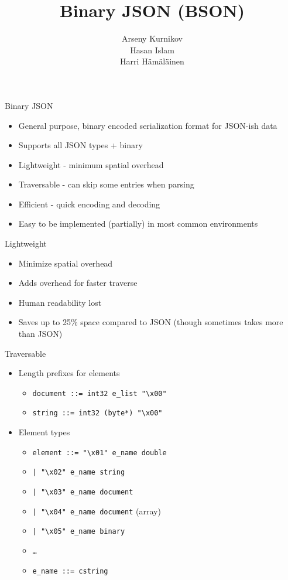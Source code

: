 \documentclass{beamer}
\title{Binary JSON (BSON)}
\author{Arseny Kurnikov\\
Hasan Islam\\
Harri Hämäläinen}
\begin{document}
\begin{frame}
\titlepage
\end{frame}

\begin{frame}{Binary JSON}
    \begin{itemize}
        \item General purpose, binary encoded serialization format for JSON-ish data
        \item Supports all JSON types + binary
        \item Lightweight - minimum spatial overhead 
        \item Traversable - can skip some entries when parsing
        \item Efficient - quick encoding and decoding
        \item Easy to be implemented (partially) in most common environments
    \end{itemize}
\end{frame}

\begin{frame}{Lightweight}
    \begin{itemize}
        \item Minimize spatial overhead
        \item Adds overhead for faster traverse
        \item Human readability lost
        \item Saves up to 25\% space compared to JSON (though sometimes takes more than JSON)
    \end{itemize}
\end{frame}

\begin{frame}{Traversable}
    \begin{itemize}
        \item Length prefixes for elements
        \begin{itemize}
            \item \texttt{document ::= int32 e\_list "\textbackslash x00"}
            \item \texttt{string ::= int32 (byte*) "\textbackslash x00"}
        \end{itemize}
        \item Element types
        \begin{itemize}
            \item \texttt{element ::= "\textbackslash x01" e\_name double}
            \item \texttt{| "\textbackslash x02" e\_name string}
            \item \texttt{| "\textbackslash x03" e\_name document}
            \item \texttt{| "\textbackslash x04" e\_name document} (array)
            \item \texttt{| "\textbackslash x05" e\_name binary}
            \item \texttt{\dots}
            \item \texttt{e\_name ::= cstring}
        \end{itemize}
    \end{itemize}
\end{frame}
\end{document}
